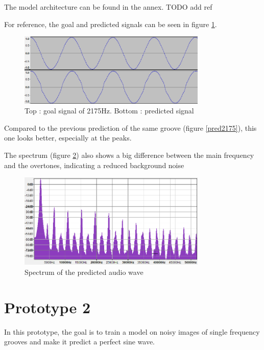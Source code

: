 \documentclass[12pt, twoside]{article}
\begin{document}
The model architecture can be found in the annex. TODO add ref

For reference, the goal and predicted signals can be seen in figure \ref{predm1}.
\begin{figure}
	\centering
	\includegraphics[width=0.8\textwidth]{../images/predm1.png}
	\caption{Top : goal signal of 2175Hz. Bottom : predicted signal}
	\label{predm1}
\end{figure}
Compared to the previous prediction of the same groove (figure \ref{pred2175}), this one looks better, especially at the peaks.

The spectrum (figure \ref{spectrumm1}) also shows a big difference between the main frequency and the overtones, indicating a reduced background noise
\begin{figure}
	\centering
	\includegraphics[width=0.8\textwidth]{../images/spectrum_m1.png}
	\caption{Spectrum of the predicted audio wave}
	\label{spectrumm1}
\end{figure}
\section{Prototype 2}
In this prototype, the goal is to train a model on noisy images of single frequency grooves and make it predict a perfect sine wave.
\end{document}
